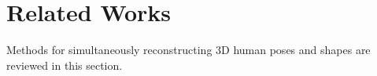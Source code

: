 \documentclass[10pt,twocolumn,letterpaper]{article}
\begin{document}
\section{Related Works}




Methods for simultaneously reconstructing 3D human poses and shapes are reviewed in this section.



\end{document}
